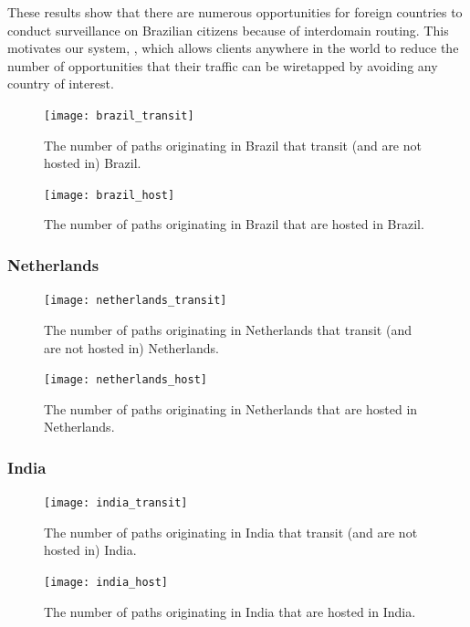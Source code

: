 These results show that there are numerous opportunities for foreign countries to conduct surveillance on Brazilian citizens because of interdomain routing.  This motivates our system, \system{}, which allows clients anywhere in the world to reduce the number of opportunities that their traffic can be wiretapped by avoiding any country of interest.  

\begin{figure}[t!]
\centering
\texttt{[image: brazil\_transit]}
\caption{The number of paths originating in Brazil that transit (and are not hosted in) Brazil.}
\label{fig:host}
\end{figure} 

\begin{figure}[t!]
\centering
\texttt{[image: brazil\_host]}
\caption{The number of paths originating in Brazil that are hosted in Brazil.}
\label{fig:host}
\end{figure} 

\subsubsection{Netherlands}

\begin{figure}[t!]
\centering
\texttt{[image: netherlands\_transit]}
\caption{The number of paths originating in Netherlands that transit (and are not hosted in) Netherlands.}
\label{fig:host}
\end{figure} 

\begin{figure}[t!]
\centering
\texttt{[image: netherlands\_host]}
\caption{The number of paths originating in Netherlands that are hosted in Netherlands.}
\label{fig:host}
\end{figure} 

\subsubsection{India}

\begin{figure}[t!]
\centering
\texttt{[image: india\_transit]}
\caption{The number of paths originating in India that transit (and are not hosted in) India.}
\label{fig:host}
\end{figure} 

\begin{figure}[t!]
\centering
\texttt{[image: india\_host]}
\caption{The number of paths originating in India that are hosted in India.}
\label{fig:host}
\end{figure} 

